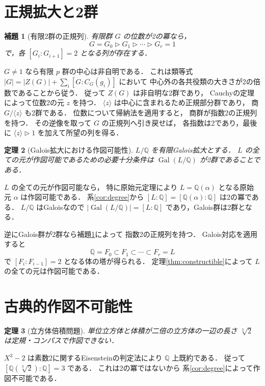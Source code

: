 \documentclass[a5paper,10pt,onecolumn]{jsarticle}
\makeatletter
\theoremstyle{mathnotetheorem}
\newtheorem{theorem}{定理}[section]
\newtheorem{lemma}[theorem]{補題}
\renewcommand{\proofname}{証明}
\renewenvironment{proof}[1][\proofname]{%
  \par\pushQED{\qed}\normalfont\topsep4\p@\@plus2\p@\relax
  \trivlist\item[\hskip\labelsep\bfseries #1]\ignorespaces
}{\popQED\endtrivlist\@endpefalse}
\makeatother
\begin{document}
\section{正規拡大と2群}

\begin{lemma}[有限2群の正規列]\label{lem:2group}
有限群 $G$ の位数が2の冪なら，
\[
 G=G_0\triangleright G_1\triangleright\cdots
 \triangleright G_r=1
\]
で，各 $[G_i:G_{i+1}]=2$ となる列が存在する．
\end{lemma}
\begin{proof}
$G\ne1$ なら有限 $p$ 群の中心は非自明である．
これは類等式
$|G|=|Z(G)|+\sum_i[G:C_G(g_i)]$ において
中心外の各共役類の大きさが2の倍数であることから従う．
従って $Z(G)$ は非自明な2群であり，
Cauchyの定理によって位数2の元 $z$ を持つ．
$\langle z\rangle$ は中心に含まれるため正規部分群であり，
商 $G/\langle z\rangle$ も2群である．
位数について帰納法を適用すると，
商群が指数2の正規列を持つ．
その逆像を取って $G$ の正規列へ引き戻せば，
各指数は2であり，最後に $\langle z\rangle\triangleright1$
を加えて所望の列を得る．
\end{proof}

\begin{theorem}[Galois拡大における作図可能性]
\label{thm:galois-2}
$L/\mathbb Q$ を有限Galois拡大とする．
$L$ の全ての元が作図可能であるための必要十分条件は
$\operatorname{Gal}(L/\mathbb Q)$ が2群であることである．
\end{theorem}
\begin{proof}
$L$ の全ての元が作図可能なら，
特に原始元定理により
$L=\mathbb Q(\alpha)$ となる原始元 $\alpha$ は作図可能である．
系\ref{cor:degree}から
$[L:\mathbb Q]=[\mathbb Q(\alpha):\mathbb Q]$
は2の冪である．
$L/\mathbb Q$ はGaloisなので
$|\operatorname{Gal}(L/\mathbb Q)|=[L:\mathbb Q]$
であり，Galois群は2群となる．

逆にGalois群が2群なら補題\ref{lem:2group}によって
指数2の正規列を持つ．
Galois対応を適用すると
\[
 \mathbb Q=F_0\subset F_1\subset\cdots\subset F_r=L
\]
で $[F_i:F_{i-1}]=2$ となる体の塔が得られる．
定理\ref{thm:constructible}によって
$L$ の全ての元は作図可能である．
\end{proof}

\section{古典的作図不可能性}

\begin{theorem}[立方体倍積問題]\label{thm:duplication}
単位立方体と体積が二倍の立方体の一辺の長さ
$\sqrt[3]2$ は定規・コンパスで作図できない．
\end{theorem}
\begin{proof}
$X^3-2$ は素数2に関するEisensteinの判定法により
$\mathbb Q$ 上既約である．
従って
$[\mathbb Q(\sqrt[3]2):\mathbb Q]=3$
である．
これは2の冪ではないから
系\ref{cor:degree}によって作図不可能である．
\end{proof}
\end{document}
